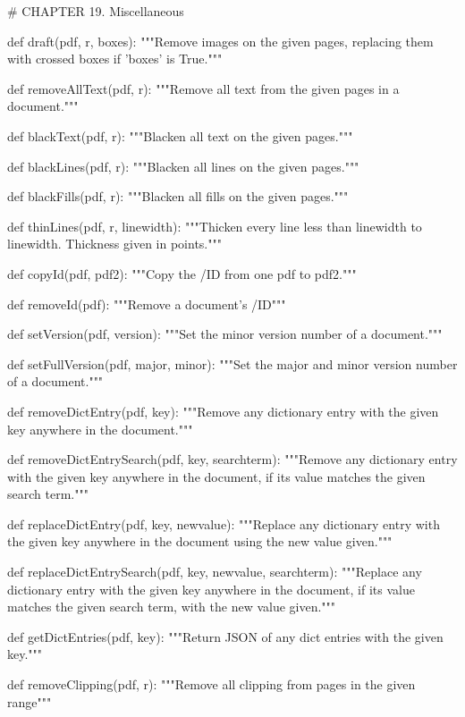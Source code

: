 # CHAPTER 19. Miscellaneous

def draft(pdf, r, boxes):
    """Remove images on the given pages, replacing them with crossed boxes if
    'boxes' is True."""

def removeAllText(pdf, r):
    """Remove all text from the given pages in a document."""

def blackText(pdf, r):
    """Blacken all text on the given pages."""

def blackLines(pdf, r):
    """Blacken all lines on the given pages."""

def blackFills(pdf, r):
    """Blacken all fills on the given pages."""

def thinLines(pdf, r, linewidth):
    """Thicken every line less than linewidth to linewidth. Thickness given in
    points."""

def copyId(pdf, pdf2):
    """Copy the /ID from one pdf to pdf2."""

def removeId(pdf):
    """Remove a document's /ID"""

def setVersion(pdf, version):
    """Set the minor version number of a document."""

def setFullVersion(pdf, major, minor):
    """Set the major and minor version number of a document."""

def removeDictEntry(pdf, key):
    """Remove any dictionary entry with the given key anywhere in the
    document."""

def removeDictEntrySearch(pdf, key, searchterm):
    """Remove any dictionary entry with the given key anywhere in the document,
    if its value matches the given search term."""

def replaceDictEntry(pdf, key, newvalue):
    """Replace any dictionary entry with the given key anywhere in the document
    using the new value given."""

def replaceDictEntrySearch(pdf, key, newvalue, searchterm):
    """Replace any dictionary entry with the given key anywhere in the
    document, if its value matches the given search term, with the new value
    given."""

def getDictEntries(pdf, key):
    """Return JSON of any dict entries with the given key."""

def removeClipping(pdf, r):
    """Remove all clipping from pages in the given range"""
